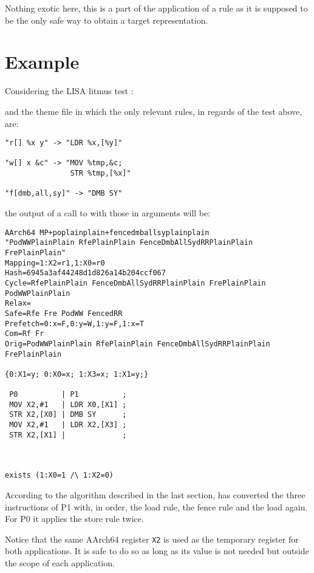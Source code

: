 Nothing exotic here, this is a part of the application of a rule as it is supposed
to be the only safe way to obtain a target representation.

\section{Example}

Considering the LISA litmus test
:



and the theme file  in which the
only relevant rules, in regards of the test above, are:

\begin{verbatim}
"r[] %x y" -> "LDR %x,[%y]"

"w[] x &c" -> "MOV %tmp,&c;
               STR %tmp,[%x]"

"f[dmb,all,sy]" -> "DMB SY"
\end{verbatim}

the output of a call to \jingle{} with those in arguments will be:
\begin{verbatim}
AArch64 MP+poplainplain+fencedmballsyplainplain
"PodWWPlainPlain RfePlainPlain FenceDmbAllSydRRPlainPlain FrePlainPlain"
Mapping=1:X2=r1,1:X0=r0
Hash=6945a3af44248d1d826a14b204ccf067
Cycle=RfePlainPlain FenceDmbAllSydRRPlainPlain FrePlainPlain PodWWPlainPlain
Relax=
Safe=Rfe Fre PodWW FencedRR
Prefetch=0:x=F,0:y=W,1:y=F,1:x=T
Com=Rf Fr
Orig=PodWWPlainPlain RfePlainPlain FenceDmbAllSydRRPlainPlain FrePlainPlain

{0:X1=y; 0:X0=x; 1:X3=x; 1:X1=y;}

 P0          | P1          ;
 MOV X2,#1   | LDR X0,[X1] ;
 STR X2,[X0] | DMB SY      ;
 MOV X2,#1   | LDR X2,[X3] ;
 STR X2,[X1] |             ;



exists (1:X0=1 /\ 1:X2=0)
\end{verbatim}

According to the algorithm described in the last section,
\jingle{} has converted the three instructions of P1 with,
in order, the load rule, the fence rule and the load again.
For P0 it applies the store rule twice.

Notice that the same AArch64 register \verb+X2+ is used as
the temporary register for both applications. It is safe to do so
as long as  its value is not needed but outside the scope
of each application.

